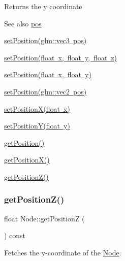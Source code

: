 \begin{DoxyReturn}{Returns}
the y coordinate 
\end{DoxyReturn}
\begin{DoxySeeAlso}{See also}
\mbox{\hyperlink{classsage_1_1Node_a26c32e5ec11e0ed7f33053ecac6830d5}{pos}} 

\mbox{\hyperlink{classsage_1_1Node_a12f5d88d221aa5db70c2bd53f6dc049a}{set\+Position(glm\+::vec3 pos)}} 

\mbox{\hyperlink{classsage_1_1Node_ad9899110e543c6b16997512e47c142c9}{set\+Position(float x, float y, float z)}} 

\mbox{\hyperlink{classsage_1_1Node_aaa8545c103ef1b35e5076dbedab93af5}{set\+Position(float x, float y)}} 

\mbox{\hyperlink{classsage_1_1Node_ae2731cefe38e706c2bf21afae6da18b3}{set\+Position(glm\+::vec2 pos)}} 

\mbox{\hyperlink{classsage_1_1Node_ae1dfc73d6122a95778d5d9db3d1fd913}{set\+Position\+X(float x)}} 

\mbox{\hyperlink{classsage_1_1Node_a5c97d36655f0daa71a5f6c715d2b0470}{set\+Position\+Y(float y)}} 

\mbox{\hyperlink{classsage_1_1Node_a11fbdf2a2dcdf8bdc014df65f3003925}{get\+Position()}} 

\mbox{\hyperlink{classsage_1_1Node_a17e92da5beaeb4b299c4e93729a22b1a}{get\+Position\+X()}} 

\mbox{\hyperlink{classsage_1_1Node_a0c6023aabdeeff9cf981ad81e6aaed9c}{get\+Position\+Z()}} 
\end{DoxySeeAlso}
\mbox{\label{classsage_1_1Node_a0c6023aabdeeff9cf981ad81e6aaed9c}} 
\subsubsection{\texorpdfstring{getPositionZ()}{getPositionZ()}}
{\footnotesize\ttfamily float Node\+::get\+PositionZ (\begin{DoxyParamCaption}{ }\end{DoxyParamCaption}) const}



Fetches the y-\/coordinate of the \mbox{\hyperlink{classsage_1_1Node}{Node}}. 

